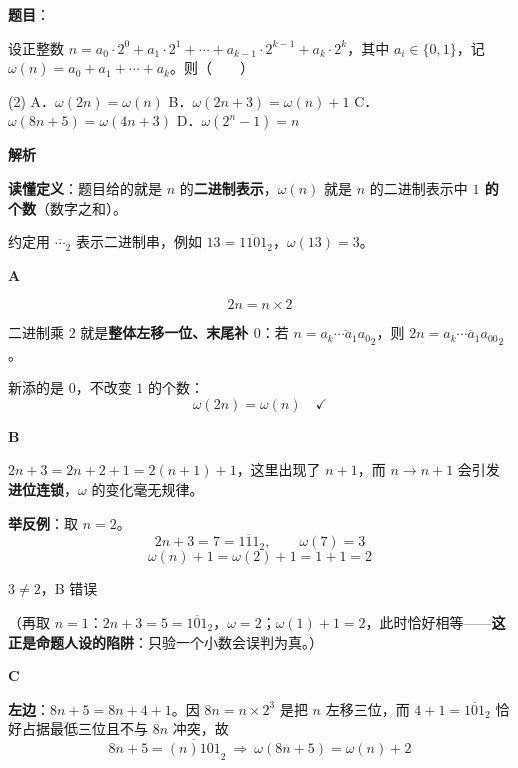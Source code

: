 \begin{answer}

\textbf{题目}：

设正整数 $n=a_0\cdot2^{0}+a_1\cdot2^{1}+\cdots+a_{k-1}\cdot2^{k-1}+a_k\cdot2^{k}$，其中 $a_i\in\{0,1\}$，记 $\omega(n)=a_0+a_1+\cdots+a_k$。则\mbox{（　　）}

\begin{gkopts}(2)
\task A．$\omega(2n)=\omega(n)$
\task B．$\omega(2n+3)=\omega(n)+1$
\task C．$\omega(8n+5)=\omega(4n+3)$
\task D．$\omega\left(2^{n}-1\right)=n$
\end{gkopts}

\textbf{解析}

\textbf{读懂定义}：题目给的就是 $n$ 的\textbf{二进制表示}，$\omega(n)$ 就是 $n$ 的二进制表示中 \textbf{$1$ 的个数}（数字之和）。

约定用 $\overline{\cdots}_2$ 表示二进制串，例如 $13=\overline{1101}_2$，$\omega(13)=3$。

\par\medskip

\textbf{A }

\nopagebreak[4]
\[2n=n\times2\]

二进制乘 $2$ 就是\textbf{整体左移一位、末尾补 $0$}：若 $n=\overline{a_k\cdots a_1a_0}_2$，则 $2n=\overline{a_k\cdots a_1a_00}_2$。

新添的是 $0$，不改变 $1$ 的个数：
\nopagebreak[4]
\[\omega(2n)=\omega(n)\quad\checkmark\]

\par\medskip

\textbf{B }

$2n+3=2n+2+1=2(n+1)+1$，这里出现了 $n+1$，而 $n\to n+1$ 会引发\textbf{进位连锁}，$\omega$ 的变化毫无规律。

\textbf{举反例}：取 $n=2$。
\nopagebreak[4]
\[2n+3=7=\overline{111}_2,\qquad \omega(7)=3\]
\nopagebreak[4]
\[\omega(n)+1=\omega(2)+1=1+1=2\]

$3\ne2$，B 错误 

（再取 $n=1$：$2n+3=5=\overline{101}_2$，$\omega=2$；$\omega(1)+1=2$，此时恰好相等——\textbf{这正是命题人设的陷阱}：只验一个小数会误判为真。）

\par\medskip

\textbf{C }

\textbf{左边}：$8n+5=8n+4+1$。因 $8n=n\times2^{3}$ 是把 $n$ 左移三位，而 $4+1=\overline{101}_2$ 恰好占据最低三位且不与 $8n$ 冲突，故
\nopagebreak[4]
\[8n+5=\overline{(n)101}_2\ \Longrightarrow\ \omega(8n+5)=\omega(n)+2\]


\end{answer}
